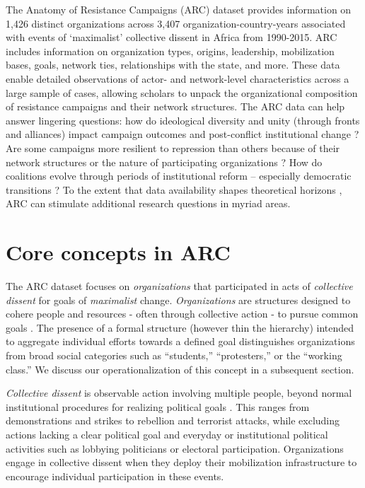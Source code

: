 The Anatomy of Resistance Campaigns (ARC) dataset provides information on 1,426
distinct organizations across 3,407 organization-country-years associated with
events of `maximalist' collective dissent in Africa from 1990-2015. ARC includes
information on organization types, origins, leadership, mobilization bases,
goals, network ties, relationships with the state, and more. These data enable
detailed observations of actor- and network-level characteristics across a large
sample of cases, allowing scholars to unpack the organizational composition of
resistance campaigns and their network structures. The ARC data can help answer
lingering questions: how do ideological diversity and unity (through fronts and
alliances) impact campaign outcomes and post-conflict institutional change
\citep{Chenoweth2011, Bayer2016, Celestino2013}? Are some campaigns more
resilient to repression than others because of their network structures or the
nature of participating organizations \citep{Sutton2014, Siegel2009}? How do
coalitions evolve through periods of institutional reform -- especially
democratic transitions \citep{Pinckney2020}? To the extent that data
availability shapes theoretical horizons \citep{Gleditsch2014}, ARC can
stimulate additional research questions in myriad areas.

\section{Core concepts in ARC}

The ARC dataset focuses on \emph{organizations} that participated in acts of
\emph{collective dissent} for goals of \emph{maximalist} change.
\textit{Organizations} are structures designed to cohere people and resources -
often through collective action - to pursue common goals \citep[2]{North1990,
Daft1992}. The presence of a formal structure (however thin the hierarchy)
intended to aggregate individual efforts towards a defined goal distinguishes
organizations from broad social categories such as ``students,'' ``protesters,''
or the ``working class.'' We discuss our operationalization of this concept in a
subsequent section.    

\emph{Collective dissent} is observable action involving multiple people, beyond
normal institutional procedures for realizing political goals \citep{Tilly1978}.
This ranges from demonstrations and strikes to rebellion and terrorist attacks,
while excluding actions lacking a clear political goal and everyday or
institutional political activities such as lobbying politicians or electoral
participation. Organizations engage in collective dissent when they deploy their
mobilization infrastructure to encourage individual participation in these
events.  

